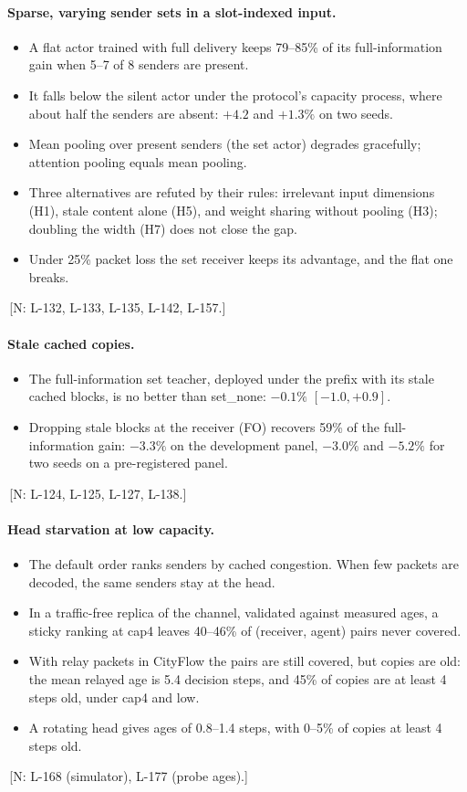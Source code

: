 \documentclass[11pt]{article}
\theoremstyle{definition}
\newif\ifshownotes\shownotestrue
\newcommand{\NOTE}[1]{\ifshownotes{\color{notecol}\,\textsf{\footnotesize[N: #1]}}\fi}
\begin{document}
\paragraph{Sparse, varying sender sets in a slot-indexed input.}
\begin{itemize}
\item A flat actor trained with full delivery keeps 79--85\% of its full-information gain when 5--7 of 8 senders are
present.
\item It falls below the silent actor under the protocol's capacity process, where about half the senders are absent:
$+4.2$ and $+1.3\%$ on two seeds.
\item Mean pooling over present senders (the set actor) degrades gracefully; attention pooling equals mean pooling.
\item Three alternatives are refuted by their rules: irrelevant input dimensions (H1), stale content alone (H5), and
weight sharing without pooling (H3); doubling the width (H7) does not close the gap.
\item Under 25\% packet loss the set receiver keeps its advantage, and the flat one breaks.
\end{itemize}
\NOTE{L-132, L-133, L-135, L-142, L-157.}
\paragraph{Stale cached copies.}
\begin{itemize}
\item The full-information set teacher, deployed under the prefix with its stale cached blocks, is no better than
set\_none: $-0.1\%$ $[-1.0,+0.9]$.
\item Dropping stale blocks at the receiver (FO) recovers 59\% of the full-information gain: $-3.3\%$ on the development
panel, $-3.0\%$ and $-5.2\%$ for two seeds on a pre-registered panel.
\end{itemize}
\NOTE{L-124, L-125, L-127, L-138.}
\paragraph{Head starvation at low capacity.}
\begin{itemize}
\item The default order ranks senders by cached congestion. When few packets are decoded, the same senders stay at the
head.
\item In a traffic-free replica of the channel, validated against measured ages, a sticky ranking at cap4 leaves 40--46\%
of (receiver, agent) pairs never covered.
\item With relay packets in CityFlow the pairs are still covered, but copies are old: the mean relayed age is 5.4 decision
steps, and 45\% of copies are at least 4 steps old, under cap4 and low.
\item A rotating head gives ages of 0.8--1.4 steps, with 0--5\% of copies at least 4 steps old.
\end{itemize}
\NOTE{L-168 (simulator), L-177 (probe ages).}
\end{document}
